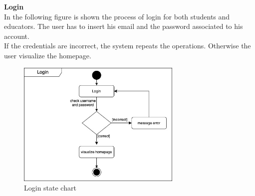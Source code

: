 \textbf{Login}\\
In the following figure is shown the process of login for both students and educators. 
The user has to insert his email and the password associated to his account.
\\If the credentials are incorrect, the system repeats the operations. Otherwise the user visualize the homepage.
\begin{figure} [H]
  \centering
  \includegraphics[width=0.7\textwidth]{images/state_diagrams/Login.jpg}
  \caption{Login state chart}
\end{figure} \vspace{1cm}

